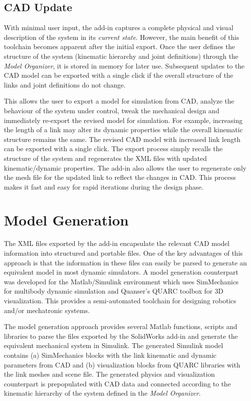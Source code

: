 \subsection{CAD Update} %
\label{sub:cad_update}
With minimal user input, the add-in captures a complete physical and visual description of the system in its \emph{current state}. However, the main benefit of this toolchain becomes apparent after the initial export. Once the user defines the structure of the system (kinematic hierarchy and joint definitions) through the \emph{Model Organizer}, it is stored in memory for later use. Subsequent updates to the CAD model can be exported with a single click if the overall structure of the links and joint definitions do not change.

This allows the user to export a model for simulation from CAD, analyze the behaviour of the system under control, tweak the mechanical design and immediately re-export the revised model for simulation. For example, increasing the length of a link may alter its dynamic properties  while the overall kinematic structure remains the same. The revised CAD model with increased link length can be exported with a single click. The export process simply recalls the structure of the system and regenerates the XML files with updated kinematic/dynamic properties. The add-in also allows the user to regenerate only the mesh file for the updated link to reflect the changes in CAD. This process makes it fast and easy for rapid iterations during the design phase.


\section{Model Generation} %
\label{sec:model_generation}

The XML files exported by the add-in encapsulate the relevant CAD model information into structured and portable files. One of the key advantages of this approach is that the information in these files can easily be parsed to generate an equivalent model in most dynamic simulators. A model generation counterpart was developed for the Matlab/Simulink environment which uses SimMechanics for multibody dynamic simulation and Quanser's QUARC toolbox for 3D visualization. This provides a semi-automated toolchain for designing robotics and/or mechatronic systems.

The model generation approach provides several Matlab functions, scripts and libraries to parse the files exported by the SolidWorks add-in and generate the equivalent mechanical system in Simulink. The generated Simulink model contains (a) SimMechanics blocks with the link kinematic and dynamic parameters from CAD and (b) visualization blocks from QUARC libraries with the link meshes and scene file. The generated physics and visualization counterpart is prepopulated with CAD data and connected according to the kinematic hierarchy of the system defined in the \emph{Model Organizer}.

